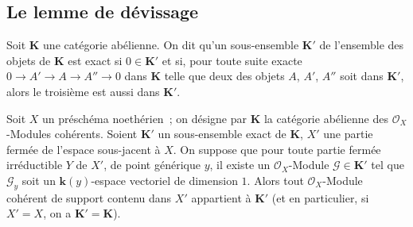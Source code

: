 \subsection{Le lemme de dévissage}
\label{subsection:III.3.1-fr}

\begin{definition}[3.1.1]
\label{III.3.1.1-fr}
Soit $\boldsymbol{K}$ une catégorie abélienne. On dit qu'un sous-ensemble $\boldsymbol{K}'$ de
l'ensemble des objets de $\boldsymbol{K}$ est exact si $0\in\boldsymbol{K}'$ et si, pour toute
suite exacte
$0\to A'\to A\to A''\to0$
dans $\boldsymbol{K}$ telle que deux des objets $A$, $A'$, $A''$ soit dans $\boldsymbol{K}'$, alors le
troisième est aussi dans $\boldsymbol{K}'$.
\end{definition}

\begin{theorem}[3.1.2]
\label{III.3.1.2-fr}
Soit $X$ un préschéma noethérien~; on désigne par $\boldsymbol{K}$ la catégorie abélienne
des $\mathcal O_X$-Modules cohérents. Soient $\boldsymbol{K}'$ un sous-ensemble exact de
$\boldsymbol{K}$, $X'$ une partie fermée de l'espace sous-jacent à $X$. On suppose que
pour toute partie fermée irréductible $Y$ de $X'$, de point générique $y$, il
existe un $\mathcal O_X$-Module $\mathcal G\in\boldsymbol{K}'$ tel que $\mathcal G_y$ soit
un $\boldsymbol{k}(y)$-espace vectoriel de dimension $1$. Alors tout $\mathcal O_X$-Module
cohérent de support contenu dans $X'$ appartient à $\boldsymbol{K}'$ (et en particulier,
si $X'=X$, on a $\boldsymbol{K}'=\boldsymbol{K}$).
\end{theorem}

